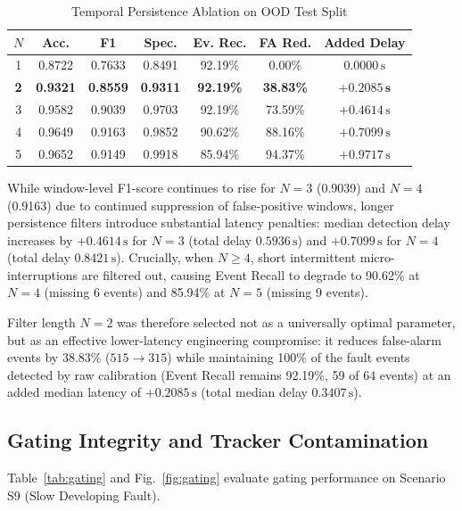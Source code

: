 \documentclass[conference]{IEEEtran}
\begin{document}
\begin{table}[!t]
\caption{Temporal Persistence Ablation on OOD Test Split}
\label{tab:persistence}
\centering
\begingroup
\footnotesize
\setlength{\tabcolsep}{2.5pt}
\begin{tabular*}{\columnwidth}{@{\extracolsep{\fill}}ccccccc@{}}
\toprule
$N$ & \textbf{Acc.} & \textbf{F1} & \textbf{Spec.} & \textbf{Ev. Rec.} & \textbf{FA Red.} & \textbf{Added Delay} \\
\midrule
1 & 0.8722 & 0.7633 & 0.8491 & 92.19\% & 0.00\% & $0.0000\,\text{s}$ \\
\textbf{2} & \textbf{0.9321} & \textbf{0.8559} & \textbf{0.9311} & \textbf{92.19\%} & \textbf{38.83\%} & $\mathbf{+0.2085\,\text{s}}$ \\
3 & 0.9582 & 0.9039 & 0.9703 & 92.19\% & 73.59\% & $+0.4614\,\text{s}$ \\
4 & 0.9649 & 0.9163 & 0.9852 & 90.62\% & 88.16\% & $+0.7099\,\text{s}$ \\
5 & 0.9652 & 0.9149 & 0.9918 & 85.94\% & 94.37\% & $+0.9717\,\text{s}$ \\
\bottomrule
\end{tabular*}
\endgroup
\end{table}

While window-level F1-score continues to rise for $N=3$ (0.9039) and $N=4$ (0.9163) due to continued suppression of false-positive windows, longer persistence filters introduce substantial latency penalties: median detection delay increases by $+0.4614\,\text{s}$ for $N=3$ (total delay $0.5936\,\text{s}$) and $+0.7099\,\text{s}$ for $N=4$ (total delay $0.8421\,\text{s}$). Crucially, when $N \ge 4$, short intermittent micro-interruptions are filtered out, causing Event Recall to degrade to 90.62\% at $N=4$ (missing 6 events) and 85.94\% at $N=5$ (missing 9 events). 

Filter length $N=2$ was therefore selected not as a universally optimal parameter, but as an effective lower-latency engineering compromise: it reduces false-alarm events by 38.83\% ($515 \to 315$) while maintaining 100\% of the fault events detected by raw calibration (Event Recall remains 92.19\%, 59 of 64 events) at an added median latency of $+0.2085\,\text{s}$ (total median delay $0.3407\,\text{s}$).

\subsection{Gating Integrity and Tracker Contamination}
Table~\ref{tab:gating} and Fig.~\ref{fig:gating} evaluate gating performance on Scenario S9 (Slow Developing Fault).
\end{document}

